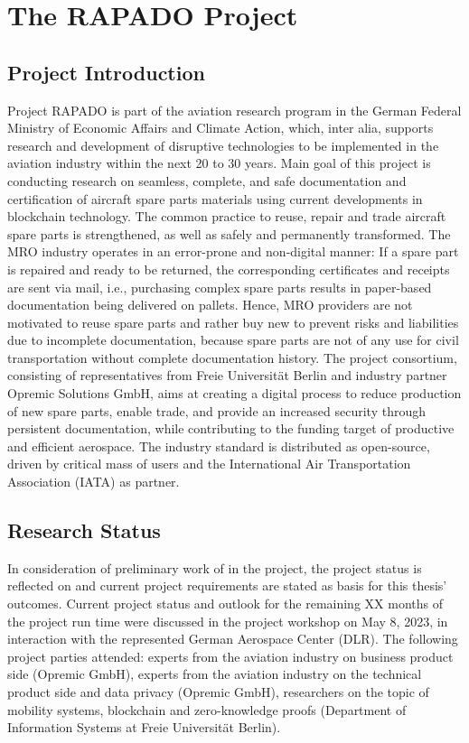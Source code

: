 \chapter{The RAPADO Project}
\section{Project Introduction}
Project RAPADO is part of the aviation research program in the German Federal Ministry of Economic Affairs and Climate Action, which, inter alia, supports research and development of disruptive technologies to be implemented in the aviation industry within the next 20 to 30 years. Main goal of this project is conducting research on seamless, complete, and safe documentation and certification of aircraft spare parts materials using current developments in blockchain technology. The common practice to reuse, repair and trade aircraft spare parts is strengthened, as well as safely and permanently transformed. The MRO industry operates in an error-prone and non-digital manner: If a spare part is repaired and ready to be returned, the corresponding certificates and receipts are sent via mail, i.e., purchasing complex spare parts results in paper-based documentation being delivered on pallets. Hence, MRO providers are not motivated to reuse spare parts and rather buy new to prevent risks and liabilities due to incomplete documentation, because spare parts are not of any use for civil transportation without complete documentation history. The project consortium, consisting of representatives from Freie Universit{\"a}t Berlin and industry partner Opremic Solutions GmbH, aims at creating a digital process to reduce production of new spare parts, enable trade, and provide an increased security through persistent documentation, while contributing to the funding target of productive and efficient aerospace. The industry standard is distributed as open-source, driven by critical mass of users and the International Air Transportation Association (IATA) as partner.

\section{Research Status}
In consideration of preliminary work of \citet{ZedelJ, Wickboldt2019BlockchainFW, semesterproject} in the project, the project status is reflected on and current project requirements are stated as basis for this thesis' outcomes. Current project status and outlook for the remaining XX months of the project run time were discussed in the project workshop on May 8, 2023, in interaction with the represented German Aerospace Center (DLR). The following project parties attended: experts from the aviation industry on business product side (Opremic GmbH), experts from the aviation industry on the technical product side and data privacy (Opremic GmbH), researchers on the topic of mobility systems, blockchain and zero-knowledge proofs (Department of Information Systems at Freie Universit{\"a}t Berlin). 

